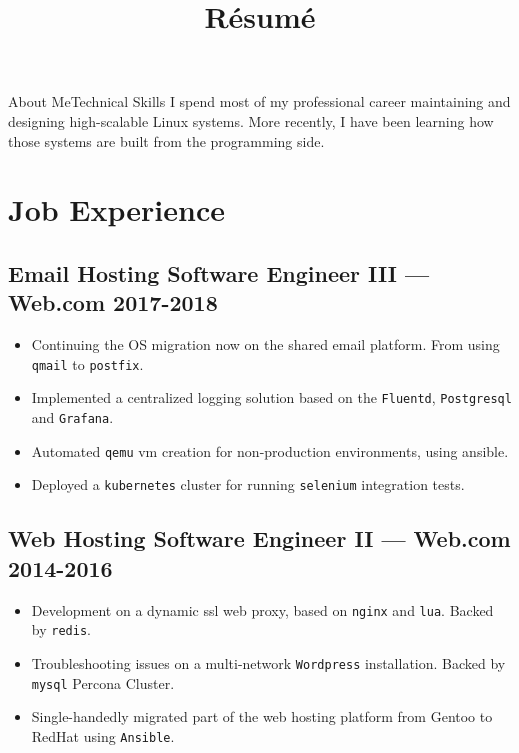 \documentclass[11pt]{article}
\begin{document}
\title{R\'esum\'e}
\author{\FULLNAME}

\maketitle{\today}

\makeabout
    {About Me}{Technical Skills}
    {
      I spend most of my professional career maintaining and designing high-scalable Linux systems.
      More recently, I have been learning how those systems are built from the programming side.
    }

\section{Job Experience}


\subsection{Email Hosting Software Engineer III --- Web.com \hfill 2017-2018}
\begin{itemize}
\item Continuing the OS migration now on the shared email platform. From using \texttt{qmail} to \texttt{postfix}.
\item Implemented a centralized logging solution based on the \texttt{Fluentd}, \texttt{Postgresql} and \texttt{Grafana}.
\item Automated \texttt{qemu} vm creation for non-production environments, using ansible.
\item Deployed a \texttt{kubernetes} cluster for running \texttt{selenium} integration tests.
\end{itemize}

\subsection{Web Hosting Software Engineer II --- Web.com \hfill 2014-2016}
\begin{itemize}
\item Development on a dynamic ssl web proxy, based on \texttt{nginx} and \texttt{lua}. Backed by \texttt{redis}.
\item Troubleshooting issues on a multi-network \texttt{Wordpress} installation. Backed by \texttt{mysql} Percona Cluster.
\item Single-handedly migrated part of the web hosting platform from Gentoo to RedHat using \texttt{Ansible}.
\end{itemize}
\end{document}
